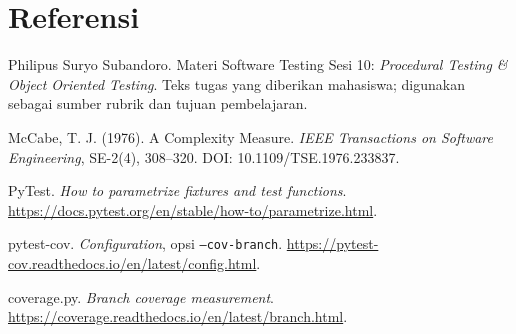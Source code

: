 \documentclass[11pt,a4paper]{article}
\begin{document}
\section{Referensi}
\begin{enumerate}[label={[\arabic*]},itemsep=5pt]
\item Philipus Suryo Subandoro. Materi Software Testing Sesi 10:
\textit{Procedural Testing \& Object Oriented Testing}. Teks tugas yang
diberikan mahasiswa; digunakan sebagai sumber rubrik dan tujuan pembelajaran.
\item McCabe, T. J. (1976). A Complexity Measure. \textit{IEEE Transactions on
Software Engineering}, SE-2(4), 308--320. DOI: 10.1109/TSE.1976.233837.
\item PyTest. \textit{How to parametrize fixtures and test functions}.
\url{https://docs.pytest.org/en/stable/how-to/parametrize.html}.
\item pytest-cov. \textit{Configuration}, opsi \texttt{--cov-branch}.
\url{https://pytest-cov.readthedocs.io/en/latest/config.html}.
\item coverage.py. \textit{Branch coverage measurement}.
\url{https://coverage.readthedocs.io/en/latest/branch.html}.
\end{enumerate}
\end{document}
